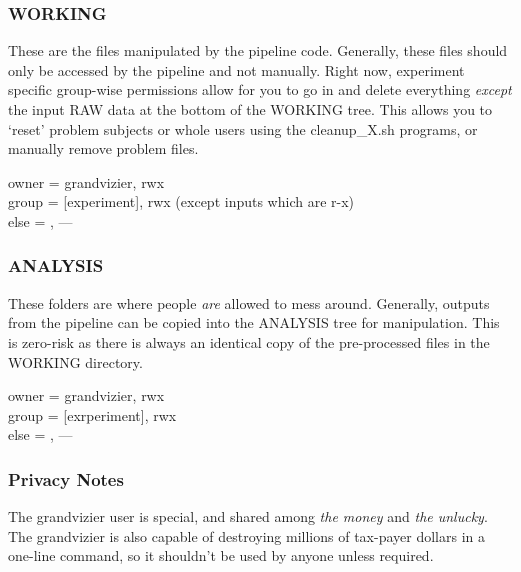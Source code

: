 \documentclass[final,titlepage,letterpaper,oneside,12pt]{article}
\renewcommand{\texttt}[2][BrickRed]{\textcolor{#1}{\ttfamily #2}}%
\begin{document}
\subsubsection{WORKING}

These are the files manipulated by the pipeline code. Generally, these files should only be accessed by the pipeline and not manually. Right now, experiment specific group-wise permissions allow for you to go in and delete everything \textit{except} the input RAW data at the bottom of the WORKING tree. This allows you to `reset' problem subjects or whole users using the {\color{red}\texttt{cleanup\_X.sh}} programs, or manually remove problem files.

\begin{flushleft}

\texttt{owner = grandvizier, rwx \\
        group = [experiment], rwx (except inputs which are r-x) \\
        else  =            , ---} \\
\end{flushleft}

\subsubsection{ANALYSIS}

These folders are where people \textit{are} allowed to mess around. Generally, outputs from the pipeline can be copied into the ANALYSIS tree for manipulation. This is zero-risk as there is always an identical copy of the pre-processed files in the WORKING directory.

\begin{flushleft}
\texttt{owner = grandvizier, rwx \\
        group = [exrperiment], rwx \\
        else  =            , ---} \\
\end{flushleft}

\subsubsection{Privacy Notes}

The \texttt{grandvizier} user is special, and shared among \textit{the money} and \textit{the unlucky}. The \texttt{grandvizier} is also capable of  destroying millions of tax-payer dollars in a one-line command, so it shouldn't be used by anyone unless required.
\end{document}
